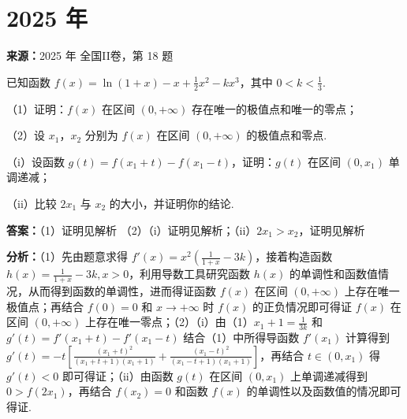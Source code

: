 \section*{2025 年}

\begin{question}[points=17]
\textbf{来源：}2025 年 全国II卷，第 18 题\par
已知函数 $f(x)=\ln(1+x)-x+\frac{1}{2}x^2-kx^3$，其中 $0<k<\frac{1}{3}$.

（1）证明：$f(x)$ 在区间 $(0,+\infty)$ 存在唯一的极值点和唯一的零点；

（2）设 $x_1$，$x_2$ 分别为 $f(x)$ 在区间 $(0,+\infty)$ 的极值点和零点.

（i）设函数 $g(t)=f(x_1+t)-f(x_1-t)$，证明：$g(t)$ 在区间 $(0,x_1)$ 单调递减；

（ii）比较 $2x_1$ 与 $x_2$ 的大小，并证明你的结论.
\begin{solution}
\textbf{答案：}（1）证明见解析
（2）（i）证明见解析；（ii）$2x_1>x_2$，证明见解析

\textbf{分析：}（1）先由题意求得 $f'(x)=x^2\left(\frac{1}{1+x}-3k\right)$，接着构造函数 $h(x)=\frac{1}{1+x}-3k,x>0$，利用导数工具研究函数 $h(x)$ 的单调性和函数值情况，从而得到函数的单调性，进而得证函数 $f(x)$ 在区间 $(0,+\infty)$ 上存在唯一极值点；再结合 $f(0)=0$ 和 $x\to+\infty$ 时 $f(x)$ 的正负情况即可得证 $f(x)$ 在区间 $(0,+\infty)$ 上存在唯一零点；（2）（i）由（1）$x_1+1=\frac{1}{3k}$ 和 $g'(t)=f'(x_1+t)-f'(x_1-t)$ 结合（1）中所得导函数 $f'(x_1)$ 计算得到 $g'(t)=-t\left[\frac{(x_1+t)^2}{(x_1+t+1)(x_1+1)}+\frac{(x_1-t)^2}{(x_1-t+1)(x_1+1)}\right]$，再结合 $t\in(0,x_1)$ 得 $g'(t)<0$ 即可得证；（ii）由函数 $g(t)$ 在区间 $(0,x_1)$ 上单调递减得到 $0>f(2x_1)$，再结合 $f(x_2)=0$ 和函数 $f(x)$ 的单调性以及函数值的情况即可得证.


\end{solution}
\end{question}
